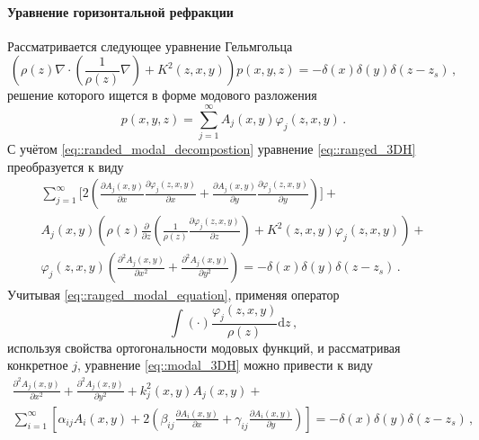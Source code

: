 \documentclass{fefu}
\newcommand{\pa}[1]{\left(#1\right)}
\begin{document}
                \paragraph{Уравнение горизонтальной рефракции}
                    \par Рассматривается следующее уравнение Гельмгольца
                    \begin{equation}\label{eq::ranged_3DH}
                        \pa{\rho\pa{z}\nabla\cdot\pa{\frac{1}{\rho\pa{z}}\nabla} + K^2\pa{z,x,y}}p\pa{x,y,z}=-\delta\pa{x}\delta\pa{y}\delta\pa{z-z_s}\,,
                    \end{equation}
                    решение которого ищется в форме модового разложения 
                    \begin{equation}\label{eq::randed_modal_decompostion}
                        p\pa{x,y,z}=\sum\limits_{j=1}^\infty A_j\pa{x,y}\varphi_j\pa{z,x,y}\,.
                    \end{equation}
                    С учётом \eqref{eq::randed_modal_decompostion} уравнение \eqref{eq::ranged_3DH} преобразуется к виду
                    \begin{multline}\label{eq::modal_3DH}
                        \sum\limits_{j=1}^\infty\biggl[2\pa{\frac{\partial A_j\pa{x,y}}{\partial x}\frac{\partial\varphi_j\pa{z,x,y}}{\partial x}+\frac{\partial A_j\pa{x,y}}{\partial y}\frac{\partial\varphi_j\pa{z,x,y}}{\partial y}}\biggr]+\\
                        A_j\pa{x,y}\pa{\rho\pa{z}\frac{\partial}{\partial z}\pa{\frac{1}{\rho\pa{z}}\frac{\partial\varphi_j\pa{z,x,y}}{\partial z}}+K^2\pa{z,x,y}\varphi_j\pa{z,x,y}}+\\
                        \varphi_j\pa{z,x,y}\pa{\frac{\partial^2A_j\pa{x,y}}{\partial x^2}+\frac{\partial^2A_j\pa{x,y}}{\partial y^2}}=-\delta\pa{x}\delta\pa{y}\delta\pa{z-z_s}\,.
                    \end{multline}
                    Учитывая \eqref{eq::ranged_modal_equation}, применяя оператор
                    \begin{equation}
                        \int\pa{\cdot}\frac{\varphi_j\pa{z,x,y}}{\rho\pa{z}}\text{d}z\,,
                    \end{equation}
                    используя свойства ортогональности модовых функций, и рассматривая конкретное $j$, уравнение \eqref{eq::modal_3DH} можно привести к виду
                    \begin{multline}
                        \frac{\partial^2A_j\pa{x,y}}{\partial x^2}+\frac{\partial^2A_j\pa{x,y}}{\partial y^2}+k_j^2\pa{x,y}A_j\pa{x,y}+\\
                        \sum\limits_{i=1}^\infty\left[\alpha_{ij}A_i\pa{x,y}+2\pa{\beta_{ij}\frac{\partial A_i\pa{x,y}}{\partial x}+\gamma_{ij}\frac{\partial A_i\pa{x,y}}{\partial y}}\right]=-\delta\pa{x}\delta\pa{y}\delta\pa{z-z_s}\,,
                    \end{multline}
\end{document}
